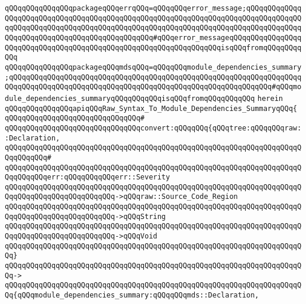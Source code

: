 \verb|qQQqqQQqqQQqqQQqpackageqQQqerrqQQq=qQQqqQQqerror_message;qQQqqQQqqQQqqQQqqQQqqQQqqQQqqQQqqQQqqQQqqQQqqQQqqQQqqQQqqQQqqQQqqQQqqQQqqQQqqQQqqQQqqQQqqQQqqQQqqQQqqQQqqQQqqQQqqQQqqQQqqQQqqQQqqQQqqQQqqQQqqQQqqQQqqQQqqQQqqQQqqQQqqQQqqQQqqQQqqQQqqQQqqQQq#qQQqerror_messageqQQqqQQqqQQqqQQqqQQqqQQqqQQqqQQqqQQqqQQqqQQqqQQqqQQqqQQqqQQqqQQqqQQqisqQQqfromqQQqqQQqqQQq|\newline
\verb|qQQqqQQqqQQqqQQqpackageqQQqmdsqQQq=qQQqqQQqmodule_dependencies_summary;qQQqqQQqqQQqqQQqqQQqqQQqqQQqqQQqqQQqqQQqqQQqqQQqqQQqqQQqqQQqqQQqqQQqqQQqqQQqqQQqqQQqqQQqqQQqqQQqqQQqqQQqqQQqqQQqqQQqqQQqqQQqqQQqqQQq#qQQqmodule_dependencies_summaryqQQqqQQqqQQqisqQQqfromqQQqqQQqqQQq|\newline
\verb|herein|\newline
\newline
\verb|qQQqqQQqqQQqqQQqapiqQQqRaw_Syntax_To_Module_Dependencies_SummaryqQQq{|\newline
\verb|qQQqqQQqqQQqqQQqqQQqqQQqqQQqqQQq#|\newline
\verb|qQQqqQQqqQQqqQQqqQQqqQQqqQQqqQQqconvert:qQQqqQQq{qQQqtree:qQQqqQQqraw::Declaration,|\newline
\verb|qQQqqQQqqQQqqQQqqQQqqQQqqQQqqQQqqQQqqQQqqQQqqQQqqQQqqQQqqQQqqQQqqQQqqQQqqQQqqQQq#|\newline
\verb|qQQqqQQqqQQqqQQqqQQqqQQqqQQqqQQqqQQqqQQqqQQqqQQqqQQqqQQqqQQqqQQqqQQqqQQqqQQqqQQqerr:qQQqqQQqqQQqerr::Severity|\newline
\verb|qQQqqQQqqQQqqQQqqQQqqQQqqQQqqQQqqQQqqQQqqQQqqQQqqQQqqQQqqQQqqQQqqQQqqQQqqQQqqQQqqQQqqQQqqQQqqQQq->qQQqraw::Source_Code_Region|\newline
\verb|qQQqqQQqqQQqqQQqqQQqqQQqqQQqqQQqqQQqqQQqqQQqqQQqqQQqqQQqqQQqqQQqqQQqqQQqqQQqqQQqqQQqqQQqqQQqqQQq->qQQqString|\newline
\verb|qQQqqQQqqQQqqQQqqQQqqQQqqQQqqQQqqQQqqQQqqQQqqQQqqQQqqQQqqQQqqQQqqQQqqQQqqQQqqQQqqQQqqQQqqQQqqQQq->qQQqVoid|\newline
\verb|qQQqqQQqqQQqqQQqqQQqqQQqqQQqqQQqqQQqqQQqqQQqqQQqqQQqqQQqqQQqqQQqqQQqqQQq}|\newline
\verb|qQQqqQQqqQQqqQQqqQQqqQQqqQQqqQQqqQQqqQQqqQQqqQQqqQQqqQQqqQQqqQQqqQQqqQQq->|\newline
\verb|qQQqqQQqqQQqqQQqqQQqqQQqqQQqqQQqqQQqqQQqqQQqqQQqqQQqqQQqqQQqqQQqqQQqqQQq{qQQqmodule_dependencies_summary:qQQqqQQqmds::Declaration,|\newline
